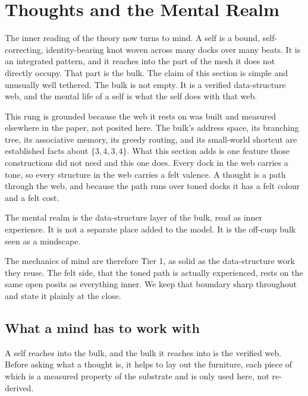 \section{Thoughts and the Mental Realm}

The inner reading of the theory now turns to mind. A self is a bound, self-correcting, identity-bearing knot woven across many docks over many beats. It is an integrated pattern, and it reaches into the part of the mesh it does not directly occupy. That part is the bulk. The claim of this section is simple and unusually well tethered. The bulk is not empty. It is a verified data-structure web, and the mental life of a self is what the self does with that web.

This rung is grounded because the web it rests on was built and measured elsewhere in the paper, not posited here. The bulk's address space, its branching tree, its associative memory, its greedy routing, and its small-world shortcut are established facts about $\{3,4,3,4\}$. What this section adds is one feature those constructions did not need and this one does. Every dock in the web carries a tone, so every structure in the web carries a felt valence. A thought is a path through the web, and because the path runs over toned docks it has a felt colour and a felt cost.

\begin{principle}
The mental realm is the data-structure layer of the bulk, read as inner experience. It is not a separate place added to the model. It is the off-cusp bulk seen as a mindscape.
\end{principle}

The mechanics of mind are therefore Tier 1, as solid as the data-structure work they reuse. The felt side, that the toned path is actually experienced, rests on the same open posits as everything inner. We keep that boundary sharp throughout and state it plainly at the close.

\subsection{What a mind has to work with}

A self reaches into the bulk, and the bulk it reaches into is the verified web. Before asking what a thought is, it helps to lay out the furniture, each piece of which is a measured property of the substrate and is only used here, not re-derived.


